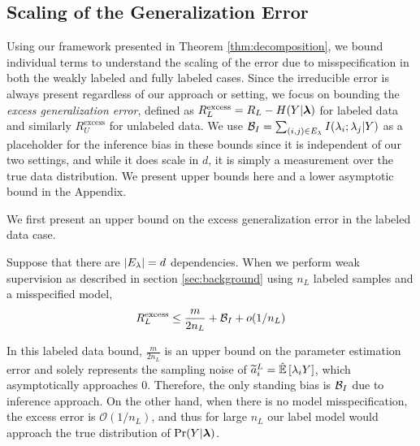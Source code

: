 
\subsection{Scaling of the Generalization Error} %
\label{subsec:scaling}

Using our framework presented in Theorem \ref{thm:decomposition}, we bound individual terms to understand the scaling of the error due to misspecification in both the weakly labeled and fully labeled cases. Since the irreducible error is always present regardless of our approach or setting, we focus on bounding the \textit{excess generalization error}, defined as $R^{\mathrm{excess}}_L = R_L -  H(Y|\bm{\lambda})$ for labeled data and similarly $R^{\mathrm{excess}}_U$ for unlabeled data.  We use $\mathcal{B}_I = \sum_{(i, j) \in E_{\lambda}} I(\lambda_i; \lambda_j | Y)$ as a placeholder for the inference bias in these bounds since it is independent of our two settings, and while it does scale in $d$, it is simply a measurement over the true data distribution. We present upper bounds here and a lower asymptotic bound in the Appendix.

We first present an upper bound on the excess generalization error in the labeled data case. 
\begin{theorem}
Suppose that there are $|E_{\lambda}| = d$ dependencies. When we perform weak supervision as described in section \ref{sec:background} using $n_L$ labeled samples and a misspecified model,
\begin{align}
   R_L^{\mathrm{excess}} \le \frac{m}{2n_L} + \mathcal{B}_I + o(1/n_L) 
\end{align}
\label{thm:labeled}
\end{theorem}

In this labeled data bound, $\frac{m}{2n_L}$ is an upper bound on the parameter estimation error and solely represents the sampling noise of $\widetilde{a}_i^L = \hat{\mathbb{E}}\left[\lambda_i Y\right]$, which asymptotically approaches $0$. %
Therefore, the only standing bias is $\mathcal{B}_I$ due to inference approach. On the other hand, when there is no model misspecification, the excess error is $\mathcal{O}(1/n_L)$, and thus for large $n_L$ our label model would approach the true distribution of $\Pr(Y | \bm{\lambda})$.  

